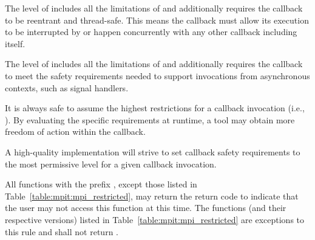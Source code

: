 The level of  includes all the
limitations of  and
additionally requires the callback to be reentrant and thread-safe.  This
means the callback must allow its execution to be
interrupted by or happen concurrently with any other callback including
itself.

The level of  includes all
the limitations of  and
additionally requires the callback to meet the safety requirements 
needed to support invocations from asynchronous contexts, such
as signal handlers.

\begin{users}
    It is always safe to assume the highest restrictions for a callback
    invocation (i.e., ).
    By evaluating the specific requirements at runtime, a tool may obtain
    more freedom of action within the callback.
\end{users}

\begin{implementors}
    A high-quality implementation will strive to set callback safety
    requirements to the most permissive level for a given callback
    invocation.
\end{implementors}

All functions with the prefix , except those listed in
Table~\ref{table:mpit:mpi_restricted}, may return the return code
to indicate that the user may not access this function at this time.
The functions (and their respective  versions) listed in
Table~\ref{table:mpit:mpi_restricted} are exceptions to this rule and shall
not return .

